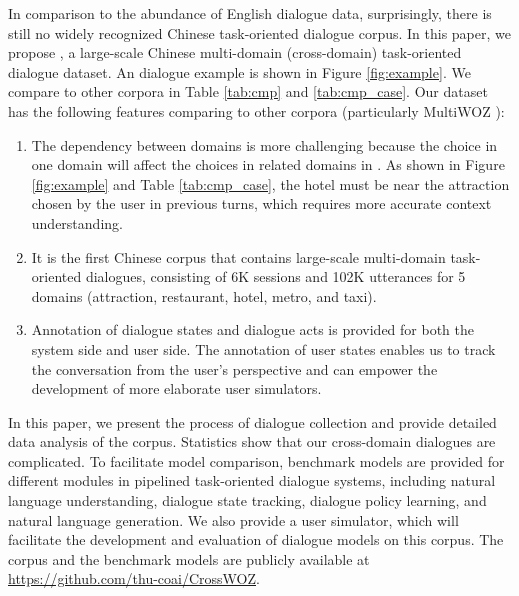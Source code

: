 In comparison to the abundance of English dialogue data, surprisingly, there is still no widely recognized Chinese task-oriented dialogue corpus. 
In this paper, we propose \textbf{\datasetName}, a large-scale Chinese  multi-domain (cross-domain) task-oriented dialogue dataset. 
An dialogue example is shown in Figure \ref{fig:example}. We compare \textbf{\datasetName} to other corpora in Table \ref{tab:cmp} and \ref{tab:cmp_case}. Our dataset has the following features comparing to other corpora (particularly MultiWOZ \cite{Multiwoz2018}):
\begin{enumerate}
    \item The dependency between domains is more challenging because the choice in one domain will affect the choices in related domains in \datasetName.
    As shown in Figure \ref{fig:example} and Table \ref{tab:cmp_case}, the hotel must be near the attraction chosen by the user in previous turns, which requires more accurate context understanding.
    
    
    \item It is the first Chinese corpus that contains large-scale multi-domain task-oriented dialogues, consisting of 6K sessions and 102K utterances for 5 domains (attraction, restaurant, hotel, metro, and taxi). 
    
    \item Annotation of dialogue states and dialogue acts is provided for both the system side and user side. The annotation of user states enables us to track the conversation from the user's perspective and can empower the development of more elaborate user simulators.
\end{enumerate}

In this paper, we present the process of dialogue collection and provide detailed data analysis of the corpus. Statistics show that our cross-domain dialogues are complicated. 
To facilitate model comparison, benchmark models are provided for different modules in pipelined task-oriented dialogue systems, including natural language understanding, dialogue state tracking, dialogue policy learning, and natural language generation. We also provide a user simulator, which will facilitate the development and evaluation of dialogue models on this corpus. 
The corpus and the benchmark models are publicly available at \url{https://github.com/thu-coai/CrossWOZ}.


